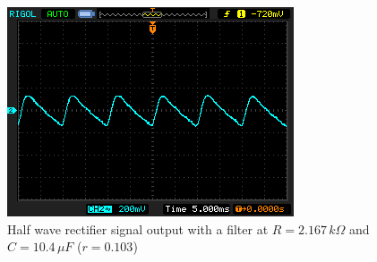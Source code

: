 \begin{figure}[H]
    \centering
    \includegraphics[width=0.67\columnwidth]{images/21.png}
    \caption{Half wave rectifier signal output with a filter at $R = 2.167\,k\Omega$ and $C = 10.4\,\mu F$ ($r=0.103$)}
\end{figure}

